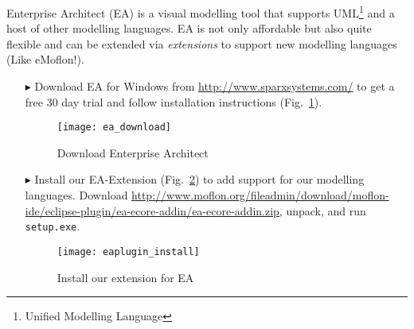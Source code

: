 \visHeader
{}

Enterprise Architect (EA) is a visual modelling tool that supports UML\footnote{Unified Modelling Language} and a host of other modelling languages.
EA is not only affordable but also quite flexible and can be extended via \emph{extensions} to support new modelling languages (Like eMoflon!).
\begin{itemize}
\item[$\blacktriangleright$] Download EA for Windows from \url{http://www.sparxsystems.com/} to get a free 30 day trial and follow installation instructions (Fig.~\ref{fig_enterpriseArchitextHomepage}).

\begin{figure}[htbp]
	\centering
  	\texttt{[image: ea\_download]}
	\caption{Download Enterprise Architect}
	\label{fig_enterpriseArchitextHomepage}
\end{figure} 

\item[$\blacktriangleright$] Install our EA-Extension (Fig.~\ref{fig_eaPluginWizard}) to add support for our modelling languages.
Download \url{http://www.moflon.org/fileadmin/download/moflon-ide/eclipse-plugin/ea-ecore-addin/ea-ecore-addin.zip}, unpack, and run \texttt{setup.exe}.

\begin{figure}[htbp]
	\centering
  \texttt{[image: eaplugin\_install]}
	\caption{Install our extension for EA}
	\label{fig_eaPluginWizard}
\end{figure}
\end{itemize}